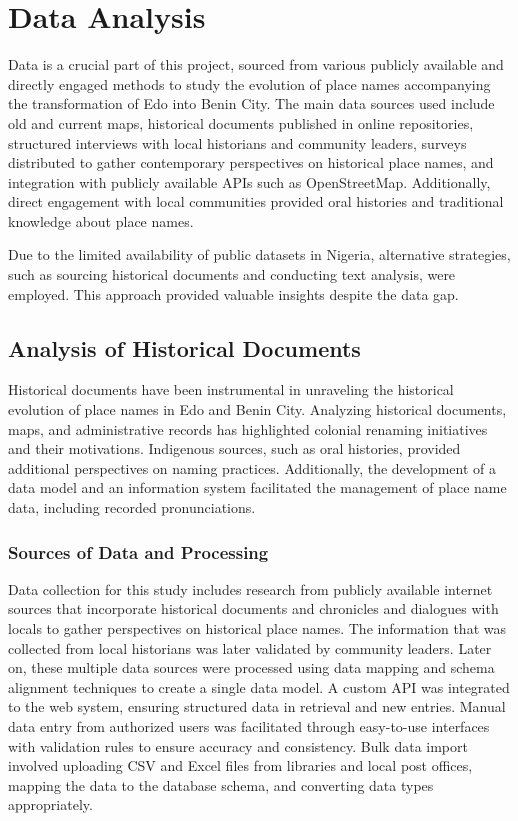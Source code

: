 \chapter{Data Analysis}
Data is a crucial part of this project, sourced from various publicly available and directly engaged methods to study the evolution of place names accompanying the transformation of Edo into Benin City. The main data sources used include old and current maps, historical documents published in online repositories, structured interviews with local historians and community leaders, surveys distributed to gather contemporary perspectives on historical place names, and integration with publicly available APIs such as OpenStreetMap. Additionally, direct engagement with local communities provided oral histories and traditional knowledge about place names.

Due to the limited availability of public datasets in Nigeria, alternative strategies, such as sourcing historical documents and conducting text analysis, were employed. This approach provided valuable insights despite the data gap.

\section{Analysis of Historical Documents}
Historical documents have been instrumental in unraveling the historical evolution of place names in Edo and Benin City. Analyzing historical documents, maps, and administrative records has highlighted colonial renaming initiatives and their motivations. Indigenous sources, such as oral histories, provided additional perspectives on naming practices. Additionally, the development of a data model and an information system facilitated the management of place name data, including recorded pronunciations.

\subsection{Sources of Data and Processing}
Data collection for this study includes research from publicly available internet sources that incorporate historical documents and chronicles and dialogues with locals to gather perspectives on historical place names. The information that was collected from local historians was later validated by community leaders. Later on, these multiple data sources were processed using data mapping and schema alignment techniques to create a single data model. A custom API was integrated to the web system, ensuring structured data in retrieval and new entries. Manual data entry from authorized users was facilitated through easy-to-use interfaces with validation rules to ensure accuracy and consistency. Bulk data import involved uploading CSV and Excel files from libraries and local post offices, mapping the data to the database schema, and converting data types appropriately.\\[-2mm]

